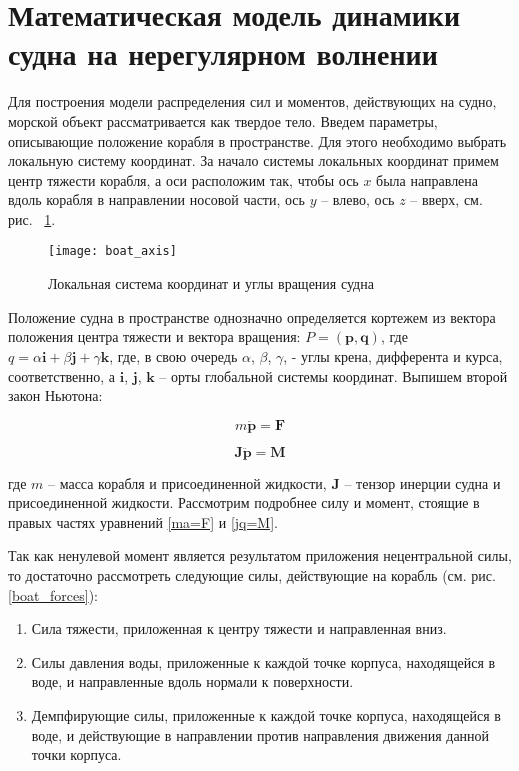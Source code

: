 \section{Математическая модель динамики судна на нерегулярном волнении}

Для построения модели распределения сил и моментов, действующих на судно, морской объект рассматривается как твердое тело. Введем параметры, описывающие положение корабля в пространстве. Для этого необходимо выбрать локальную систему координат. За начало системы локальных координат примем центр тяжести корабля, а оси расположим так, чтобы ось $x$ была направлена вдоль корабля в направлении носовой части, ось $y$ – влево, ось $z$ – вверх, см. рис. ~\ref{boat_axis}.

\begin{figure}[ht]
\begin{center}
\texttt{[image: boat\_axis]}
\end{center}
\caption{Локальная система координат и углы вращения судна}
\label{boat_axis}
\end{figure}

Положение судна в пространстве однозначно определяется кортежем из вектора положения центра тяжести и вектора вращения: 
$P=(\mathbf{p},\mathbf{q})$, 
где  
$q=\alpha \mathbf{i}+\beta \mathbf{j}+\gamma \mathbf{k}$, 
где, в свою очередь $\alpha$, $\beta$, $\gamma$,  - углы крена, дифферента и курса, соответственно, а $\mathbf{i}$, $\mathbf{j}$, $\mathbf{k}$ – орты глобальной системы координат. Выпишем второй закон Ньютона:

\begin{equation}
	m \ddot{\mathbf{p}} = \mathbf{F}
	\label{ma=F}
\end{equation}

\begin{equation}
	\mathbf{J}  \ddot{\mathbf{p}} = \mathbf{M}
	\label{jq=M}
\end{equation}

где $m$ – масса корабля и присоединенной жидкости, $\mathbf{J}$ – тензор инерции судна и присоединенной жидкости. Рассмотрим подробнее силу и момент, стоящие в правых частях уравнений \eqref{ma=F} и \eqref{jq=M}. 

Так как ненулевой момент является результатом приложения нецентральной силы, то достаточно рассмотреть следующие силы, действующие на корабль (см. рис. \ref{boat_forces}):
\begin{enumerate}
\item	Сила тяжести, приложенная к центру тяжести и направленная вниз.
\item	Силы давления воды, приложенные к каждой точке корпуса, находящейся в воде, и направленные вдоль нормали к поверхности.
\item	Демпфирующие силы, приложенные к каждой точке корпуса, находящейся в воде, и действующие в направлении против направления движения  данной точки корпуса.
\end{enumerate}

